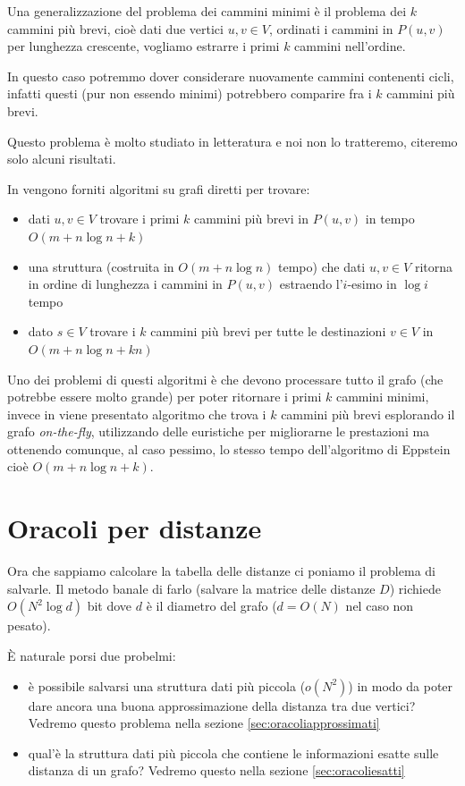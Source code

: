 \documentclass[a4paper,10pt]{amsbook}
\theoremstyle{plain}
\theoremstyle{definition}
\theoremstyle{remark}
\newcommand{\pa}[1]{\left(#1\right)}
\begin{document}
Una generalizzazione del problema dei cammini minimi è il problema dei
$k$ cammini più brevi, cioè dati due vertici $u,v \in V$, ordinati i
cammini in $P(u,v)$ per lunghezza crescente, vogliamo estrarre i primi
$k$ cammini nell'ordine.

In questo caso potremmo dover considerare nuovamente cammini
contenenti cicli, infatti questi (pur non essendo minimi) potrebbero
comparire fra i $k$ cammini più brevi.

Questo problema è molto studiato in letteratura e noi non lo
tratteremo, citeremo solo alcuni risultati.

In \cite{kshortest} vengono forniti algoritmi su grafi diretti per
trovare:
\begin{itemize}
\item dati $u,v \in V$ trovare i primi $k$ cammini più brevi in
  $P\pa{u,v}$ in tempo $O\pa{m + n\log n + k}$
\item una struttura (costruita in $O\pa{m+n\log n}$ tempo) che dati
  $u,v\in V$ ritorna in ordine di lunghezza i cammini in $P(u,v)$
  estraendo l'$i$-esimo in $\log i$ tempo
\item dato $s\in V$ trovare i $k$ cammini più brevi per tutte le
  destinazioni $v\in V$ in $O\pa{m + n\log n + kn}$
\end{itemize}

Uno dei problemi di questi algoritmi è che devono processare tutto il
grafo (che potrebbe essere molto grande) per poter ritornare i primi
$k$ cammini minimi, invece in \cite{kspheur} viene presentato
algoritmo che trova i $k$ cammini più brevi esplorando il grafo
\textit{on-the-fly}, utilizzando delle euristiche per migliorarne le
prestazioni ma ottenendo comunque, al caso pessimo, lo stesso tempo
dell'algoritmo di Eppstein cioè $O\pa{m + n\log n + k}$.

\chapter{Oracoli per distanze}

Ora che sappiamo calcolare la tabella delle distanze ci poniamo il
problema di salvarle. Il metodo banale di farlo (salvare la matrice
delle distanze $D$) richiede $O\pa{ N^2 \log d}$ bit dove $d$ è il
diametro del grafo ($d = O\pa{N}$ nel caso non pesato).

\`E naturale porsi due probelmi:
\begin{itemize}
\item è possibile salvarsi una struttura dati pi\`u piccola ($o
  \pa{ N^2}$) in modo da poter dare ancora una buona approssimazione
  della distanza tra due vertici? Vedremo questo problema nella
  sezione \ref{sec:oracoliapprossimati}
\item qual'\`e la struttura dati pi\`u piccola che contiene le
  informazioni esatte sulle distanza di un grafo? Vedremo questo nella
  sezione \ref{sec:oracoliesatti}
\end{itemize}
\end{document}
